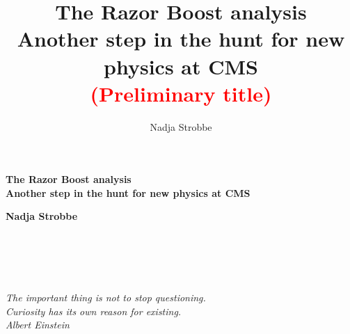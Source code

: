 \documentclass[10pt]{book}
\title{\Huge The Razor Boost analysis\\[1cm]
Another step in the hunt for new physics at CMS \\[0.5cm] \textcolor{red}{(Preliminary title)}}
\author{Nadja Strobbe}
\theoremstyle{definition}
\let\origdoublepage\cleardoublepage
\newcommand{\clearemptydoublepage}{%
  \clearpage
  {\pagestyle{empty}\origdoublepage}%
}
\begin{document}
% 



\begin{titlepage}
\begin{center}


  \vspace{4cm}

  \begin{spacing}{1.2}
  {\LARGE \bf The Razor Boost analysis\\[1cm]
  
   Another step in the hunt for new physics at CMS\par}

  \end{spacing}

  \vspace{2cm}

  {\Large \bf Nadja Strobbe}

\end{center}

\vfill


  \vspace{1eM}


\vspace{1ex}

  
  \vspace{1cm}
  
\end{titlepage}

\clearemptydoublepage

\chapter*{~}
\thispagestyle{empty}
\begin{flushright}
\vspace{4cm}

\textsl{The important thing is not to stop questioning. \\Curiosity has its own reason for
existing.\\
\vspace{2eM}
Albert Einstein }
\end{flushright}
\end{document}
